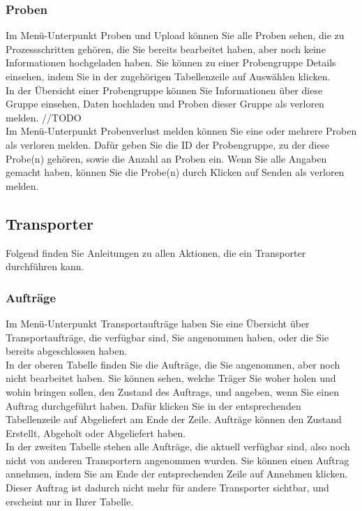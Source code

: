 \documentclass[enabledeprecatedfontcommands,fontsize=12pt,paper=a4,twoside]{scrartcl}
\begin{document}
\subsubsection{Proben}
Im Menü-Unterpunkt Proben und Upload können Sie alle Proben sehen, die zu Prozessschritten gehören, die Sie bereits bearbeitet haben, aber noch keine Informationen hochgeladen haben. Sie können zu einer Probengruppe Details einsehen, indem Sie in der zugehörigen Tabellenzeile auf Auswählen klicken.\\

In der Übersicht einer Probengruppe können Sie Informationen über diese Gruppe einsehen, Daten hochladen und Proben dieser Gruppe als verloren melden. //TODO \\

Im Menü-Unterpunkt Probenverlust melden können Sie eine oder mehrere Proben als verloren melden. Dafür geben Sie die ID der Probengruppe, zu der diese Probe(n) gehören, sowie die Anzahl an Proben ein. Wenn Sie alle Angaben gemacht haben, können Sie die Probe(n) durch Klicken auf Senden als verloren melden. \\

\subsection{Transporter}

Folgend finden Sie Anleitungen zu allen Aktionen, die ein Transporter durchführen kann. \\

\subsubsection{Aufträge}
Im Menü-Unterpunkt Transportaufträge haben Sie eine Übersicht über Transportaufträge, die verfügbar sind, Sie angenommen haben, oder die Sie bereits abgeschlossen haben. \\

In der oberen Tabelle finden Sie die Aufträge, die Sie angenommen, aber noch nicht bearbeitet haben. Sie können sehen, welche Träger Sie woher holen und wohin bringen sollen, den Zustand des Auftrags, und angeben, wenn Sie einen Auftrag durchgeführt haben. Dafür klicken Sie in der entsprechenden Tabellenzeile auf Abgeliefert am Ende der Zeile. Aufträge können den Zustand Erstellt, Abgeholt oder Abgeliefert haben. \\

In der zweiten Tabelle stehen alle Aufträge, die aktuell verfügbar sind, also noch nicht von anderen Transportern angenommen wurden. Sie können einen Auftrag annehmen, indem Sie am Ende der entsprechenden Zeile auf Annehmen klicken. Dieser Auftrag ist dadurch nicht mehr für andere Transporter sichtbar, und erscheint nur in Ihrer Tabelle. \\
\end{document}
